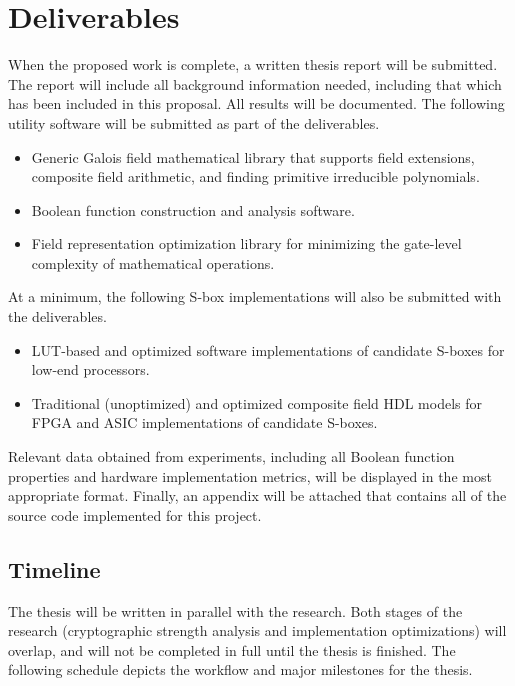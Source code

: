 \section{Deliverables}
When the proposed work is complete, a written thesis report will be submitted. The report will include all background information needed, including that which has been included in this proposal. All results will be documented. The following utility software will be submitted as part of the deliverables.
\begin{itemize}
	\item Generic Galois field mathematical library that supports field extensions, composite field arithmetic, and finding primitive irreducible polynomials.
	\item Boolean function construction and analysis software.
	\item Field representation optimization library for minimizing the gate-level complexity of mathematical operations.
\end{itemize}
At a minimum, the following S-box implementations will also be submitted with the deliverables.
\begin{itemize}
	\item LUT-based and optimized software implementations of candidate S-boxes for low-end processors.
	\item Traditional (unoptimized) and optimized composite field HDL models for FPGA and ASIC implementations of candidate S-boxes. 
\end{itemize}
Relevant data obtained from experiments, including all Boolean function properties and hardware implementation metrics, will be displayed in 
the most appropriate format. Finally, an appendix will be attached that contains all of the source code implemented for this project.

\subsection{Timeline}
The thesis will be written in parallel with the research. Both stages of the research (cryptographic strength analysis and
implementation optimizations) will overlap, and will not be completed in full until the thesis is finished. The following schedule
depicts the workflow and major milestones for the thesis. 

